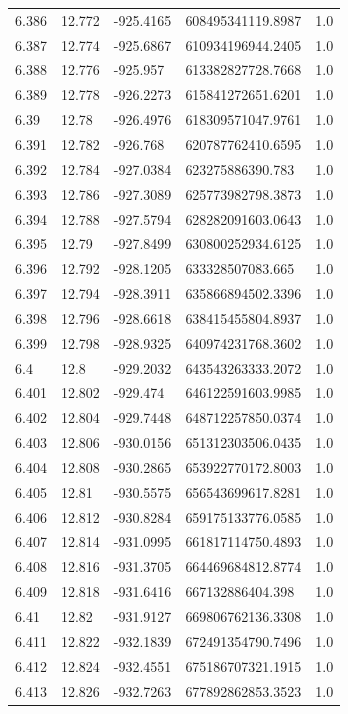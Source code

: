 \begin{tabular}{lllll}
6.386 & 12.772 & -925.4165 & 608495341119.8987 & 1.0 \\
6.387 & 12.774 & -925.6867 & 610934196944.2405 & 1.0 \\
6.388 & 12.776 & -925.957 & 613382827728.7668 & 1.0 \\
6.389 & 12.778 & -926.2273 & 615841272651.6201 & 1.0 \\
6.39 & 12.78 & -926.4976 & 618309571047.9761 & 1.0 \\
6.391 & 12.782 & -926.768 & 620787762410.6595 & 1.0 \\
6.392 & 12.784 & -927.0384 & 623275886390.783 & 1.0 \\
6.393 & 12.786 & -927.3089 & 625773982798.3873 & 1.0 \\
6.394 & 12.788 & -927.5794 & 628282091603.0643 & 1.0 \\
6.395 & 12.79 & -927.8499 & 630800252934.6125 & 1.0 \\
6.396 & 12.792 & -928.1205 & 633328507083.665 & 1.0 \\
6.397 & 12.794 & -928.3911 & 635866894502.3396 & 1.0 \\
6.398 & 12.796 & -928.6618 & 638415455804.8937 & 1.0 \\
6.399 & 12.798 & -928.9325 & 640974231768.3602 & 1.0 \\
6.4 & 12.8 & -929.2032 & 643543263333.2072 & 1.0 \\
6.401 & 12.802 & -929.474 & 646122591603.9985 & 1.0 \\
6.402 & 12.804 & -929.7448 & 648712257850.0374 & 1.0 \\
6.403 & 12.806 & -930.0156 & 651312303506.0435 & 1.0 \\
6.404 & 12.808 & -930.2865 & 653922770172.8003 & 1.0 \\
6.405 & 12.81 & -930.5575 & 656543699617.8281 & 1.0 \\
6.406 & 12.812 & -930.8284 & 659175133776.0585 & 1.0 \\
6.407 & 12.814 & -931.0995 & 661817114750.4893 & 1.0 \\
6.408 & 12.816 & -931.3705 & 664469684812.8774 & 1.0 \\
6.409 & 12.818 & -931.6416 & 667132886404.398 & 1.0 \\
6.41 & 12.82 & -931.9127 & 669806762136.3308 & 1.0 \\
6.411 & 12.822 & -932.1839 & 672491354790.7496 & 1.0 \\
6.412 & 12.824 & -932.4551 & 675186707321.1915 & 1.0 \\
6.413 & 12.826 & -932.7263 & 677892862853.3523 & 1.0 \\

\end{tabular}
